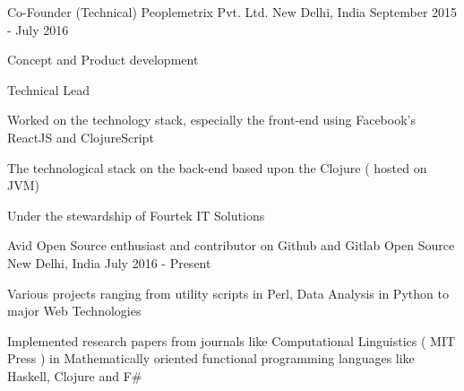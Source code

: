 \begin{cventries}
  \cventry
    {Co-Founder (Technical)} %
    {Peoplemetrix Pvt. Ltd.  } %
    {New Delhi, India} %
    {September 2015 - July 2016} %
    {
      \begin{cvitems} %
        \item {Concept and Product development}
        \item { Technical Lead}
        \item { Worked on the technology stack, especially the front-end using
            Facebook's ReactJS and ClojureScript}
        \item { The technological stack on the back-end based upon the Clojure (
            hosted on JVM) }
        \item { Under the stewardship of Fourtek IT Solutions}
      \end{cvitems}
    }

  \cventry
    {Avid Open Source enthusiast and contributor on Github and Gitlab}
    {Open Source}
    {New Delhi, India}
    {July 2016 - Present}
    {
      \begin{cvitems}
        \item {Various projects ranging from utility scripts in Perl, Data Analysis in Python to major Web Technologies}
        \item { Implemented research papers from journals like Computational Linguistics ( MIT Press ) in Mathematically oriented functional programming languages like Haskell, Clojure and F\#}
      \end{cvitems}
    }
\end{cventries}
